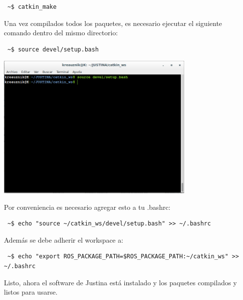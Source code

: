 \documentclass[user_manual.tex]{subfiles}
\begin{document}
\begin{verbatim}
 ~$ catkin_make
\end{verbatim}

Una vez compilados todos los paquetes, es necesario ejecutar el siguiente comando dentro del mismo directorio:

\begin{verbatim}
 ~$ source devel/setup.bash
\end{verbatim}

 \begin{center}
\includegraphics[width=0.73\textwidth]{Figures/PP/pp5.png}
\end{center}

Por conveniencia es necesario agregar esto a tu .bashrc:\\

\begin{verbatim}
 ~$ echo "source ~/catkin_ws/devel/setup.bash" >> ~/.bashrc
\end{verbatim}

Además se debe adherir el workspace a:\\

\begin{verbatim}
 ~$ echo "export ROS_PACKAGE_PATH=$ROS_PACKAGE_PATH:~/catkin_ws" >> ~/.bashrc
\end{verbatim}

Listo, ahora el software de Justina está instalado y los paquetes compilados y listos para usarse.
\end{document}
